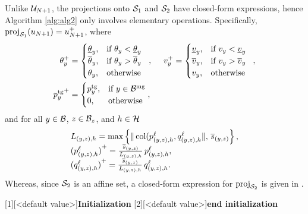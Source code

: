 %
Unlike $\mathcal U_{N+1}$, the projections onto $\mathcal S_1$ and $\mathcal S_2$ have closed-form expressions, hence Algorithm \ref{alg:alg2} only involves elementary operations. Specifically,
$	\mathrm{proj}_{\mathcal S_1}(u_{N+1})=
u_{N+1}^+$, where
\begin{align*}
	\theta_y^+ &=
	\begin{cases}
		\underline{\theta}_y, & \text{if } \theta_y < \underline{\theta}_y\\
		\overline{\theta}_y, & \text{if } \theta_y > \overline{\theta}_y\\
		\theta_y, & \text{otherwise } \
	\end{cases}, \quad \
	v_y^+ = 
	\begin{cases}
		\underline{v}_y, & \text{if } v_y < \underline{v}_y\\
		\overline{v}_y, & \text{if } v_y > \overline{v}_y\\
		v_y, & \text{otherwise } \
	\end{cases},
	\\
	{p_y^{\text{tg}}}^+ &= 
	\begin{cases}
		p_y^{\text{tg}}, & \text{if } y \in \mathcal B^{\text{mg}}\\
		0, & \text{otherwise} 
	\end{cases},
\end{align*}
and for all $y \in \mathcal B$, $z \in \mathcal B_z$, and  $h \in \mathcal H$
\begin{align*}
	\begin{array}{l}
		L_{(y,z),h} = \max \left\{ \|\operatorname{col}(p^\ell_{(y,z),h} , q^\ell_{(y,z),h} \|, \, \overline{s}_{(y,z)} \right\},\\[.2em]
		{(p^\ell_{(y,z),h})}^+  = \tfrac{\overline{s}_{(y,z)}}{
			L_{(y,z),h}
		}\,  p^\ell_{(y,z),h}, \\[.2em]
		{(q^\ell_{(y,z),h})}^+  = \tfrac{\overline{s}_{(y,z)}}{
			L_{(y,z),h}
		}\, q^\ell_{(y,z),h}.
	\end{array}
\end{align*}
Whereas, since $\mathcal S_2$ is an affine set, a closed-form expression for $\mathrm{proj}_{\mathcal S_2}$ is given in \cite[Example 29.17(ii)]{bauschke2011convex}.

\algblockdefx[init]{init}{Endinit}
[1][<default value>]{\textbf{Initialization}}
[2][<default value>]{\textbf{end initialization}}

